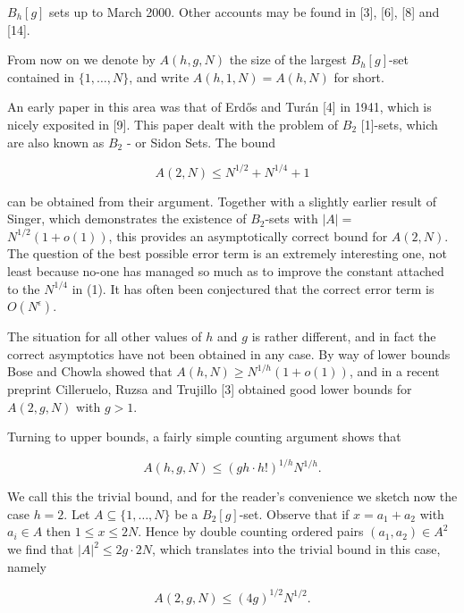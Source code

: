 \documentclass[10pt]{article}
\begin{document}
$B_{h}[g]$ sets up to March 2000. Other accounts may be found in [3], [6], [8] and [14].

From now on we denote by $A(h, g, N)$ the size of the largest $B_{h}[g]$-set contained in $\{1, \ldots, N\}$, and write $A(h, 1, N)=A(h, N)$ for short.

An early paper in this area was that of Erdős and Turán [4] in 1941, which is nicely exposited in [9]. This paper dealt with the problem of $B_{2}$ [1]-sets, which are also known as $B_{2}$ - or Sidon Sets. The bound


\begin{equation*}
A(2, N) \leq N^{1 / 2}+N^{1 / 4}+1 \tag{1}
\end{equation*}


can be obtained from their argument. Together with a slightly earlier result of Singer, which demonstrates the existence of $B_{2}$-sets with $|A|=$ $N^{1 / 2}(1+o(1))$, this provides an asymptotically correct bound for $A(2, N)$. The question of the best possible error term is an extremely interesting one, not least because no-one has managed so much as to improve the constant attached to the $N^{1 / 4}$ in (1). It has often been conjectured that the correct error term is $O\left(N^{\epsilon}\right)$.

The situation for all other values of $h$ and $g$ is rather different, and in fact the correct asymptotics have not been obtained in any case. By way of lower bounds Bose and Chowla showed that $A(h, N) \geq N^{1 / h}(1+o(1))$, and in a recent preprint Cilleruelo, Ruzsa and Trujillo [3] obtained good lower bounds for $A(2, g, N)$ with $g>1$.

Turning to upper bounds, a fairly simple counting argument shows that


\begin{equation*}
A(h, g, N) \leq(g h \cdot h!)^{1 / h} N^{1 / h} . \tag{2}
\end{equation*}


We call this the trivial bound, and for the reader's convenience we sketch now the case $h=2$. Let $A \subseteq\{1, \ldots, N\}$ be a $B_{2}[g]$-set. Observe that if $x=a_{1}+a_{2}$ with $a_{i} \in A$ then $1 \leq x \leq 2 N$. Hence by double counting ordered pairs $\left(a_{1}, a_{2}\right) \in A^{2}$ we find that $|A|^{2} \leq 2 g \cdot 2 N$, which translates into the trivial bound in this case, namely


\begin{equation*}
A(2, g, N) \leq(4 g)^{1 / 2} N^{1 / 2} . \tag{3}
\end{equation*}
\end{document}
